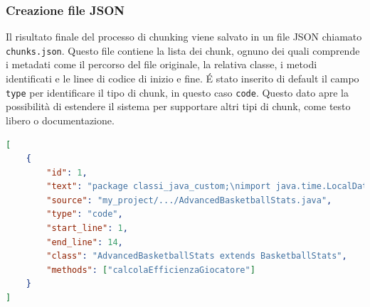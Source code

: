 \documentclass[12pt,a4paper,openright,twoside]{book}
\begin{document}
\subsubsection{Creazione file JSON}
Il risultato finale del processo di chunking viene salvato in un file JSON chiamato \texttt{chunks.json}.
Questo file contiene la lista dei chunk, ognuno dei quali comprende i metadati come il percorso del file originale, la relativa classe, i metodi identificati e le linee di codice di inizio e fine.
\'E stato inserito di default il campo \texttt{type} per identificare il tipo di chunk, in questo caso \texttt{code}.
Questo dato apre la possibilità di estendere il sistema per supportare altri tipi di chunk, come testo libero o documentazione.
\begin{lstlisting}[language=json, caption={Esempio di chunk generato}]
[
    {
        "id": 1,
        "text": "package classi_java_custom;\nimport java.time.LocalDate;...",
        "source": "my_project/.../AdvancedBasketballStats.java",
        "type": "code",
        "start_line": 1,
        "end_line": 14,
        "class": "AdvancedBasketballStats extends BasketballStats",
        "methods": ["calcolaEfficienzaGiocatore"]
    }
]
\end{lstlisting}
\end{document}
